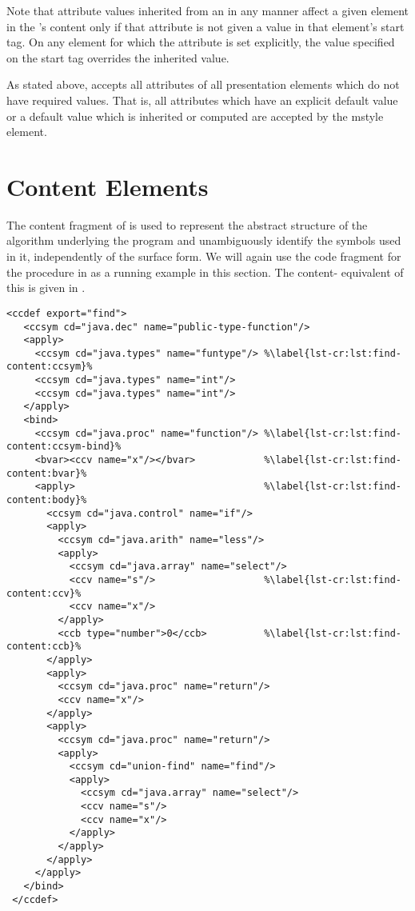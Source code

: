 Note that attribute values inherited from an {} in any manner
affect a given element in the {}'s content only if that attribute
is not given a value in that element's start tag. On any element for which the
attribute is set explicitly, the value specified on the start tag overrides the
inherited value.

As stated above, {} accepts all attributes of all {\codeml}
presentation elements which do not have required values. That is, all attributes
which have an explicit default value or a default value which is inherited or
computed are accepted by the mstyle element. 

\section{Content Elements}\label{sec:content}

The content fragment of {\codeml} is used to represent the abstract structure of
the algorithm underlying the program and unambiguously identify the symbols used
in it, independently of the surface form. We will again use the {\java} code
fragment for the {} procedure in {} as a running
example in this section. The content-{\codeml} equivalent of this is given in 
{}.

\begin{lstlisting}[float,frame=lines,label=lst:find-content,escapechar=\%,
   caption={The {\codeml} content for the code snippet in {\mylstref{find-raw}}},
   index={[2]ccdef,symbol,type,apply,bind,bvar,ccb,ccv}]
 <ccdef export="find">
   <ccsym cd="java.dec" name="public-type-function"/>
   <apply>
     <ccsym cd="java.types" name="funtype"/> %\label{lst-cr:lst:find-content:ccsym}%
     <ccsym cd="java.types" name="int"/>
     <ccsym cd="java.types" name="int"/>
   </apply>
   <bind>
     <ccsym cd="java.proc" name="function"/> %\label{lst-cr:lst:find-content:ccsym-bind}%
     <bvar><ccv name="x"/></bvar>            %\label{lst-cr:lst:find-content:bvar}%
     <apply>                                 %\label{lst-cr:lst:find-content:body}%
       <ccsym cd="java.control" name="if"/>
       <apply>
         <ccsym cd="java.arith" name="less"/>
         <apply>
           <ccsym cd="java.array" name="select"/>
           <ccv name="s"/>                   %\label{lst-cr:lst:find-content:ccv}%
           <ccv name="x"/>
         </apply>
         <ccb type="number">0</ccb>          %\label{lst-cr:lst:find-content:ccb}%
       </apply>
       <apply>
         <ccsym cd="java.proc" name="return"/>
         <ccv name="x"/>
       </apply>
       <apply>
         <ccsym cd="java.proc" name="return"/>
         <apply>
           <ccsym cd="union-find" name="find"/>
           <apply>
             <ccsym cd="java.array" name="select"/>
             <ccv name="s"/>
             <ccv name="x"/>
           </apply>
         </apply>
       </apply>
     </apply>
   </bind>
 </ccdef>
\end{lstlisting}

